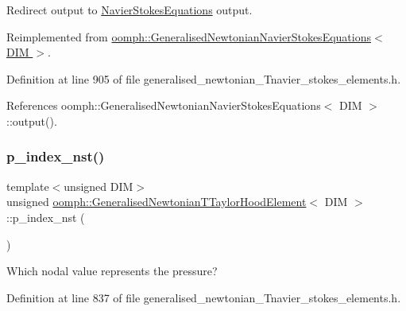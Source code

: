 Redirect output to \hyperlink{classoomph_1_1NavierStokesEquations}{Navier\+Stokes\+Equations} output. 



Reimplemented from \hyperlink{classoomph_1_1GeneralisedNewtonianNavierStokesEquations_a4cea0e2de7ce23a994bda1ee87222d21}{oomph\+::\+Generalised\+Newtonian\+Navier\+Stokes\+Equations$<$ D\+I\+M $>$}.



Definition at line 905 of file generalised\+\_\+newtonian\+\_\+\+Tnavier\+\_\+stokes\+\_\+elements.\+h.



References oomph\+::\+Generalised\+Newtonian\+Navier\+Stokes\+Equations$<$ D\+I\+M $>$\+::output().

\mbox{\label{classoomph_1_1GeneralisedNewtonianTTaylorHoodElement_a61571c3c7d44cda27fbb0b177dfb27b9}} 
\subsubsection{\texorpdfstring{p\+\_\+index\+\_\+nst()}{p\_index\_nst()}}
{\footnotesize\ttfamily template$<$unsigned D\+IM$>$ \\
unsigned \hyperlink{classoomph_1_1GeneralisedNewtonianTTaylorHoodElement}{oomph\+::\+Generalised\+Newtonian\+T\+Taylor\+Hood\+Element}$<$ D\+IM $>$\+::p\+\_\+index\+\_\+nst (\begin{DoxyParamCaption}{ }\end{DoxyParamCaption})\hspace{0.3cm}{\ttfamily [inline]}}



Which nodal value represents the pressure? 



Definition at line 837 of file generalised\+\_\+newtonian\+\_\+\+Tnavier\+\_\+stokes\+\_\+elements.\+h.

\mbox{\label{classoomph_1_1GeneralisedNewtonianTTaylorHoodElement_a33beac305cc4372aec3bf180d3ac48da}} 
